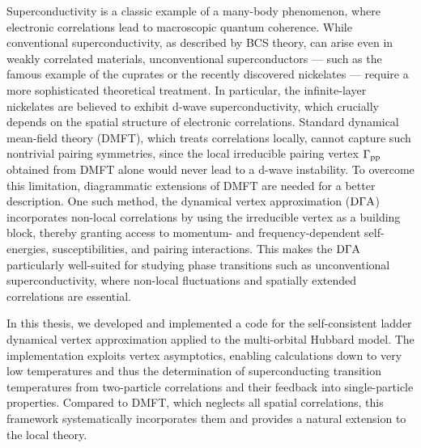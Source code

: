 \documentclass[../../main.tex]{subfiles}
\begin{document}
\vspace{1.4cm}

Superconductivity is a classic example of a many-body phenomenon, where electronic correlations lead to macroscopic quantum coherence. While conventional superconductivity, as described by BCS theory, can arise even in weakly correlated materials, unconventional superconductors --- such as the famous example of the cuprates or the recently discovered nickelates --- require a more sophisticated theoretical treatment. In particular, the infinite-layer nickelates are believed to exhibit d-wave superconductivity, which crucially depends on the spatial structure of electronic correlations. Standard dynamical mean-field theory (DMFT), which treats correlations locally, cannot capture such nontrivial pairing symmetries, since the local irreducible pairing vertex $\Gamma_{\text{pp}}$ obtained from DMFT alone would never lead to a d-wave instability. To overcome this limitation, diagrammatic extensions of DMFT are needed for a better description. One such method, the dynamical vertex approximation ($\text{D}\Gamma\text{A}$) incorporates non-local correlations by using the irreducible vertex as a building block, thereby granting access to momentum- and frequency-dependent self-energies, susceptibilities, and pairing interactions. This makes the $\text{D}\Gamma\text{A}$ particularly well-suited for studying phase transitions such as unconventional superconductivity, where non-local fluctuations and spatially extended correlations are essential.
\newline

In this thesis, we developed and implemented a code for the self-consistent ladder dynamical vertex approximation applied to the multi-orbital Hubbard model. The implementation exploits vertex asymptotics, enabling calculations down to very low temperatures and thus the determination of superconducting transition temperatures from two-particle correlations and their feedback into single-particle properties. Compared to DMFT, which neglects all spatial correlations, this framework systematically incorporates them and provides a natural extension to the local theory.
\newline
\end{document}
